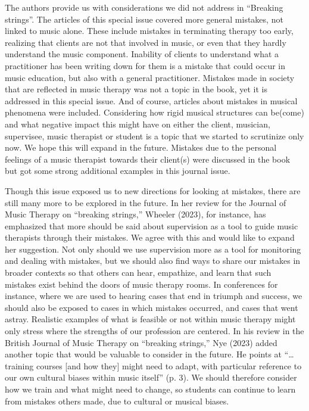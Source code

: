 \documentclass[authordate, empirical, issue]{jote-new-article}
\begin{document}
The authors provide us with considerations we did not address in “Breaking strings”. The articles of this special issue covered more general mistakes, not linked to music alone. These include mistakes in terminating therapy too early, realizing that clients are not that involved in music, or even that they hardly understand the music component. Inability of clients to understand what a practitioner has been writing down for them is a mistake that could occur in music education, but also with a general practitioner. Mistakes made in society that are reflected in music therapy was not a topic in the book, yet it is addressed in this special issue. And of course, articles about mistakes in musical phenomena were included. Considering how rigid musical structures can be(come) and what negative impact this might have on either the client, musician, supervisee, music therapist or student is a topic that we started to scrutinize only now. We hope this will expand in the future. Mistakes due to the personal feelings of a music therapist towards their client(s) were discussed in the book but got some strong additional examples in this journal issue.



Though this issue exposed us to new directions for looking at mistakes, there are still many more to be explored in the future. In her review for the Journal of Music Therapy on “breaking strings,” Wheeler (2023), for instance, has emphasized that more should be said about supervision as a tool to guide music therapists through their mistakes. We agree with this and would like to expand her suggestion. Not only should we use supervision more as a tool for monitoring and dealing with mistakes, but we should also find ways to share our mistakes in broader contexts so that others can hear, empathize, and learn that such mistakes exist behind the doors of music therapy rooms. In conferences for instance, where we are used to hearing cases that end in triumph and success, we should also be exposed to cases in which mistakes occurred, and cases that went astray. Realistic examples of what is feasible or not within music therapy might only stress where the strengths of our profession are centered. In his review in the British Journal of Music Therapy on “breaking strings,” Nye (2023) added another topic that would be valuable to consider in the future. He points at “…training courses [and how they] might need to adapt, with particular reference to our own cultural biases within music itself” (p. 3). We should therefore consider how we train and what might need to change, so students can continue to learn from mistakes others made, due to cultural or musical biases.
\end{document}
